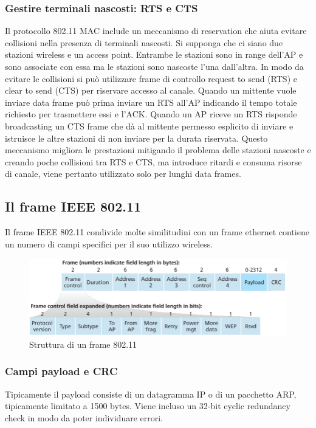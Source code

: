 \subsubsection{Gestire terminali nascosti: RTS e CTS}
Il protocollo 802.11 MAC include un meccanismo di reservation che aiuta evitare collisioni nella presenza di terminali nascosti. Si supponga che ci siano due stazioni wireless e un access point. Entrambe le
stazioni sono in range dell'AP e sono associate con essa ma le stazioni sono nascoste l'una dall'altra. In modo da evitare le collisioni si pu\`o utilizzare frame di controllo request to send (RTS) e clear to send 
(CTS) per riservare accesso al canale. Quando un mittente vuole inviare data frame pu\`o prima inviare un RTS all'AP indicando il tempo totale richiesto per trasmettere essi e l'ACK. Quando un AP riceve un RTS
risponde broadcasting un CTS frame che d\`a al mittente permesso esplicito di inviare e istruisce le altre stazioni di non inviare per la durata riservata. Questo meccanismo migliora le prestazioni mitigando il 
problema delle stazioni nascoste e creando poche collisioni tra RTS e CTS, ma introduce ritardi e consuma risorse di canale, viene pertanto utilizzato solo per lunghi data frames. 
\subsection{Il frame IEEE 802.11}
Il frame IEEE 802.11 condivide molte similitudini con un frame ethernet contiene un numero di campi specifici per il suo utilizzo wireless.
\begin{figure}[h]
\includegraphics[width=\textwidth]{Pictures/Frame80211.png}
\caption{Struttura di un frame 802.11}
\end{figure}
\subsubsection{Campi payload e CRC}
Tipicamente il payload consiste di un datagramma IP o di un pacchetto ARP, tipicamente limitato a 1500 bytes. Viene incluso un 32-bit cyclic redundancy check in modo da poter individuare errori. 
